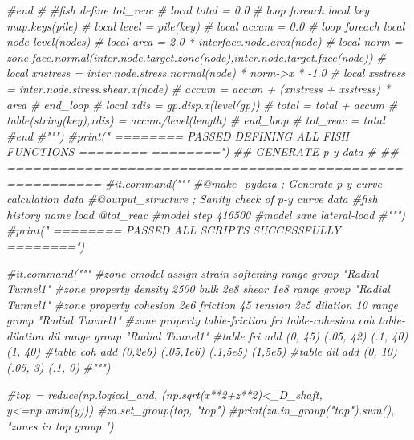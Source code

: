 \documentclass[a4paper, nobind]{templates/ociamthesis}
\newenvironment{Shaded}{\begin{snugshade}}{\end{snugshade}}
\newcommand{\CommentTok}[1]{\textcolor[rgb]{0.56,0.35,0.01}{\textit{#1}}}
\renewenvironment{Shaded}
{
  \vspace{10pt}%
  \begin{snugshade}%
}{%
  \end{snugshade}%
  \vspace{8pt}%
}
\begin{document}
\begin{Shaded}
\begin{Highlighting}[]
\CommentTok{\#end}
\CommentTok{\#}
\CommentTok{\#fish define tot\_reac}
\CommentTok{\#    local total = 0.0}
\CommentTok{\#    loop foreach local key map.keys(pile)}
\CommentTok{\#        local level = pile(key)}
\CommentTok{\#        local accum = 0.0}
\CommentTok{\#        loop foreach local node level(\textquotesingle{}nodes\textquotesingle{})}
\CommentTok{\#            local area = 2.0 * interface.node.area(node)}
\CommentTok{\#            local norm = zone.face.normal(inter.node.target.zone(node),inter.node.target.face(node))}
\CommentTok{\#            local xnstress = inter.node.stress.normal(node) * norm{-}\textgreater{}x * {-}1.0}
\CommentTok{\#            local xsstress = inter.node.stress.shear.x(node)}
\CommentTok{\#            accum = accum + (xnstress + xsstress) *  area}
\CommentTok{\#        end\_loop}
\CommentTok{\#        local xdis = gp.disp.x(level(\textquotesingle{}gp\textquotesingle{}))}
\CommentTok{\#        total = total + accum}
\CommentTok{\#        table(string(key),xdis) = accum/level(\textquotesingle{}length\textquotesingle{})}
\CommentTok{\#    end\_loop}
\CommentTok{\#    tot\_reac = total}
\CommentTok{\#end}
\CommentTok{\#""")}
\CommentTok{\#print("               ======== PASSED DEFINING ALL FISH FUNCTIONS ========        ========")}
\CommentTok{\#\# GENERATE p{-}y data \#}
\CommentTok{\#\# =========================================================}
\CommentTok{\#it.command("""}
\CommentTok{\#@make\_pydata        ; Generate p{-}y curve calculation data}
\CommentTok{\#@output\_structure   ; Sanity check of p{-}y curve data}
\CommentTok{\#fish history name \textquotesingle{}load\textquotesingle{} @tot\_reac}
\CommentTok{\#model step 416500}
\CommentTok{\#model save \textquotesingle{}lateral{-}load\textquotesingle{}}
\CommentTok{\#""")}
\CommentTok{\#print("               ======== PASSED ALL SCRIPTS SUCCESSFULLY ========")}



\CommentTok{\#it.command("""}
\CommentTok{\#zone cmodel assign strain{-}softening range group "Radial Tunnel1"}
\CommentTok{\#zone property density 2500 bulk 2e8 shear 1e8 range group "Radial Tunnel1"}
\CommentTok{\#zone property cohesion 2e6 friction 45 tension 2e5 dilation 10 range group "Radial Tunnel1"}
\CommentTok{\#zone property table{-}friction \textquotesingle{}fri\textquotesingle{} table{-}cohesion \textquotesingle{}coh\textquotesingle{} table{-}dilation \textquotesingle{}dil\textquotesingle{} range group "Radial Tunnel1"}
\CommentTok{\#table \textquotesingle{}fri\textquotesingle{} add (0, 45) (.05, 42) (.1, 40) (1, 40)}
\CommentTok{\#table \textquotesingle{}coh\textquotesingle{} add (0,2e6) (.05,1e6) (.1,5e5) (1,5e5)}
\CommentTok{\#table \textquotesingle{}dil\textquotesingle{} add (0, 10) (.05,  3) (.1,  0)}
\CommentTok{\#""")}

\CommentTok{\#top = reduce(np.logical\_and, (np.sqrt(x**2+z**2)\textless{}\_D\_shaft, y\textless{}=np.amin(y)))}
\CommentTok{\#za.set\_group(top, "top")}
\CommentTok{\#print(za.in\_group("top").sum(), "zones in top group.")}
\end{Highlighting}
\end{Shaded}
\end{document}
